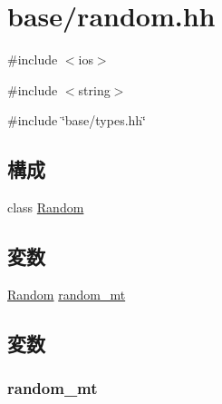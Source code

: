 \hypertarget{random_8hh}{
\section{base/random.hh}
\label{random_8hh}
}
{\ttfamily \#include $<$ios$>$}\par
{\ttfamily \#include $<$string$>$}\par
{\ttfamily \#include \char`\"{}base/types.hh\char`\"{}}\par
\subsection*{構成}
\begin{DoxyCompactItemize}
\item 
class \hyperlink{classRandom}{Random}
\end{DoxyCompactItemize}
\subsection*{変数}
\begin{DoxyCompactItemize}
\item 
\hyperlink{classRandom}{Random} \hyperlink{random_8hh_afc426934ee11701464501fa46e24e041}{random\_\-mt}
\end{DoxyCompactItemize}


\subsection{変数}
\hypertarget{random_8hh_afc426934ee11701464501fa46e24e041}{
\subsubsection[{random\_\-mt}]{ {\bf random\_\-mt}}}
\label{random_8hh_afc426934ee11701464501fa46e24e041}
